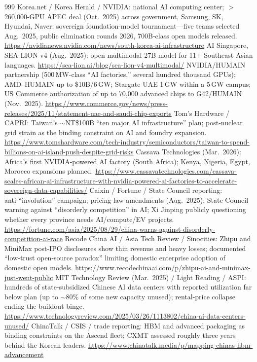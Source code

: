 \begin{thebibliography}{999}
 Korea.net / Korea Herald / NVIDIA: national AI computing center; $>$260,000-GPU APEC deal (Oct.\ 2025) across government, Samsung, SK, Hyundai, Naver; sovereign foundation-model tournament---five teams selected Aug.\ 2025, public elimination rounds 2026, 700B-class open models released. \url{https://nvidianews.nvidia.com/news/south-korea-ai-infrastructure}
 AI Singapore, SEA-LION v4 (Aug.\ 2025): open multimodal 27B model for 11+ Southeast Asian languages. \url{https://sea-lion.ai/blog/sea-lion-v4-multimodal/}
 NVIDIA/HUMAIN partnership (500\,MW-class ``AI factories,'' several hundred thousand GPUs); AMD--HUMAIN up to \$10B/6\,GW; Stargate UAE 1\,GW within a 5\,GW campus; US Commerce authorization of up to 70,000 advanced chips to G42/HUMAIN (Nov.\ 2025). \url{https://www.commerce.gov/news/press-releases/2025/11/statement-uae-and-saudi-chip-exports}
 Tom's Hardware / CAPRI: Taiwan's $\sim$NT\$100B ``ten major AI infrastructure'' plan; post-nuclear grid strain as the binding constraint on AI and foundry expansion. \url{https://www.tomshardware.com/tech-industry/semiconductors/taiwan-to-spend-billions-on-ai-island-push-despite-grid-risks}
 Cassava Technologies (Mar.\ 2026): Africa's first NVIDIA-powered AI factory (South Africa); Kenya, Nigeria, Egypt, Morocco expansions planned. \url{https://www.cassavatechnologies.com/cassava-scales-african-ai-infrastructure-with-nvidia-powered-ai-factories-to-accelerate-sovereign-data-capabilities/}
 Caixin / Fortune / State Council reporting: anti-``involution'' campaign; pricing-law amendments (Aug.\ 2025); State Council warning against ``disorderly competition'' in AI; Xi Jinping publicly questioning whether every province needs AI/compute/EV projects. \url{https://fortune.com/asia/2025/08/29/china-warns-against-disorderly-competition-ai-race}
 Recode China AI / Asia Tech Review / Sinocities: Zhipu and MiniMax post-IPO disclosures show thin revenue and heavy losses; documented ``low-trust open-source paradox'' limiting domestic enterprise adoption of domestic open models. \url{https://www.recodechinaai.com/p/zhipu-ai-and-minimax-just-went-public}
 MIT Technology Review (Mar.\ 2025) / Light Reading / ASPI: hundreds of state-subsidized Chinese AI data centers with reported utilization far below plan (up to $\sim$80\% of some new capacity unused); rental-price collapse ending the buildout binge. \url{https://www.technologyreview.com/2025/03/26/1113802/china-ai-data-centers-unused/}
 ChinaTalk / CSIS / trade reporting: HBM and advanced packaging as binding constraints on the Ascend fleet; CXMT assessed roughly three years behind the Korean leaders. \url{https://www.chinatalk.media/p/mapping-chinas-hbm-advancement}


\end{thebibliography}
